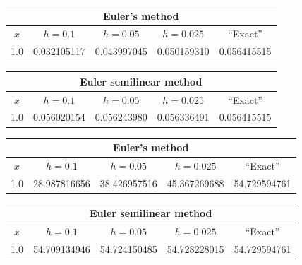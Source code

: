 \bigskip

{\small
\begin{tabular}{|c|r|r|r|r|}
\hline
\multicolumn{5}{|c|}{Euler's method}\\\hline
\multicolumn{1}{|c|}{$x$}&
\multicolumn{1}{|c|}{$h=0.1$}&
\multicolumn{1}{|c|}{$h=0.05$}&
\multicolumn{1}{|c|}{$h=0.025$}&
\multicolumn{1}{|c|}{``Exact''}\\ \hline
1.0 & 0.032105117 & 0.043997045 & 0.050159310 & 0.056415515 \\
\hline
\end{tabular}}

\bigskip

\hspace{.75in}
{\small
\begin{tabular}{|c|r|r|r|r|}
\hline
\multicolumn{5}{|c|}{Euler semilinear method}\\\hline
\multicolumn{1}{|c|}{$x$}&
\multicolumn{1}{|c|}{$h=0.1$}&
\multicolumn{1}{|c|}{$h=0.05$}&
\multicolumn{1}{|c|}{$h=0.025$}&
\multicolumn{1}{|c|}{``Exact''}\\ \hline
1.0 & 0.056020154 & 0.056243980 & 0.056336491 & 0.056415515 \\
\hline
\end{tabular}}

\bigskip

{\small
\begin{tabular}{|c|r|r|r|r|}
\hline
\multicolumn{5}{|c|}{Euler's method}\\\hline
\multicolumn{1}{|c|}{$x$}&
\multicolumn{1}{|c|}{$h=0.1$}&
\multicolumn{1}{|c|}{$h=0.05$}&
\multicolumn{1}{|c|}{$h=0.025$}&
\multicolumn{1}{|c|}{``Exact''}\\ \hline
1.0 & 28.987816656 & 38.426957516 & 45.367269688 & 54.729594761 \\
\hline
\end{tabular}}

\bigskip

\hspace{.75in}
{\small
\begin{tabular}{|c|r|r|r|r|}
\hline
\multicolumn{5}{|c|}{Euler semilinear method}\\\hline
\multicolumn{1}{|c|}{$x$}&
\multicolumn{1}{|c|}{$h=0.1$}&
\multicolumn{1}{|c|}{$h=0.05$}&
\multicolumn{1}{|c|}{$h=0.025$}&
\multicolumn{1}{|c|}{``Exact''}\\ \hline
1.0 & 54.709134946  & 54.724150485 & 54.728228015 & 54.729594761 \\
\hline
\end{tabular}}


